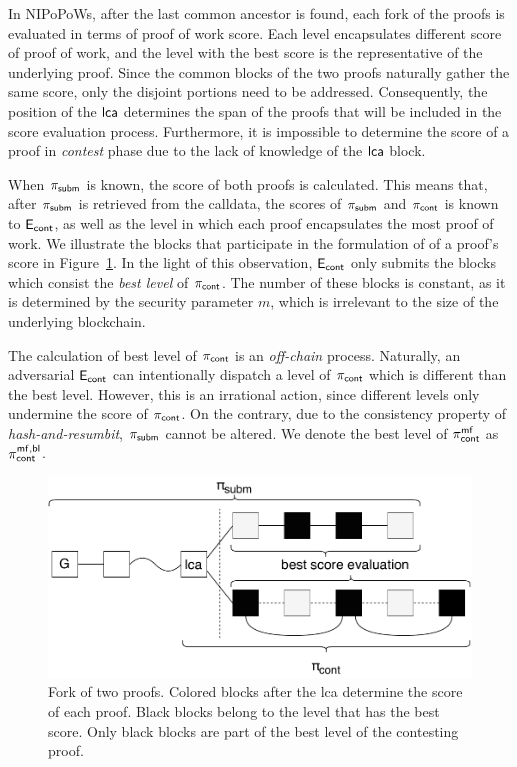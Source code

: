 In NIPoPoWs, after the last common ancestor is found, each fork of the proofs
is evaluated in terms of proof of work score. Each level encapsulates different
score of proof of work, and the level with the best score is the representative
of the underlying proof. Since the common blocks of the two proofs naturally
gather the same score, only the disjoint portions need to be addressed.
Consequently, the position of the $\mathsf{lca}$ determines the span of the proofs that
will be included in the score evaluation process. Furthermore, it is impossible
to determine the score of a proof in \emph{contest} phase due to the lack of
knowledge of the $\mathsf{lca}$ block.

When $\mathsf{\pi_{subm}}$ is known, the score of both proofs is calculated. This means that,
after $\mathsf{\pi_{subm}}$ is retrieved from the calldata, the scores of $\mathsf{\pi_{subm}}$ and $\mathsf{\pi_{cont}}$ is
known to $\mathsf{E_{cont}}$, as well as the level in which each proof encapsulates the most
proof of work. We illustrate the blocks that participate in the formulation of
of a proof's score in Figure~\ref{fig:score-at-levels}. In the light of this
observation, $\mathsf{E_{cont}}$ only submits the blocks which consist the \emph{best level}
of $\mathsf{\pi_{cont}}$. The number of these blocks is constant, as it is determined by the
security parameter $m$, which is irrelevant to the size of the underlying
blockchain.

The calculation of best level of $\mathsf{\pi_{cont}}$ is an \emph{off-chain} process.
Naturally, an adversarial $\mathsf{E_{cont}}$ can intentionally dispatch a level of $\mathsf{\pi_{cont}}$
which is different than the best level. However, this is an irrational action,
since different levels only undermine the score of $\mathsf{\pi_{cont}}$. On the contrary, due
to the consistency property of \emph{hash-and-resumbit}, $\mathsf{\pi_{subm}}$ cannot be
altered. We denote the best level of $\mathsf{\pi_{cont}^{mf}}$ as $\mathsf{\pi_{cont}^{mf, bl}}$.

\begin{figure}[!h]
    \begin{center}
        \includegraphics[width=1\columnwidth]{figures/blocks-of-best-level.pdf}
    \end{center}
    \caption{Fork of two proofs. Colored blocks after the lca determine the
    score of each proof. Black blocks belong to the level that
    has the best score. Only black blocks are part of the best level of the
    contesting proof.}
    \label{fig:score-at-levels}
\end{figure}

